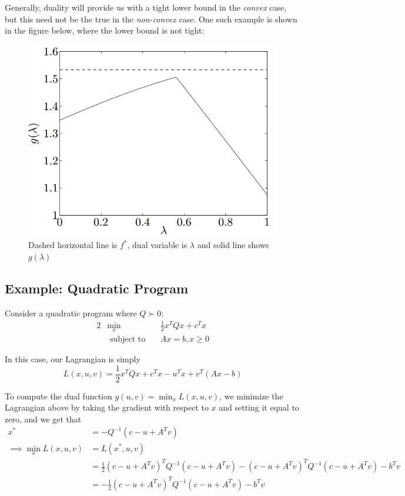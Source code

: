 \documentclass[twoside]{article}
\begin{document}
Generally, duality will provide us with a tight lower bound in the
\textit{convex} case, but this need not be the true in the \textit{non-convex} case. One such example is shown in the figure below, where the lower bound is not tight:
\begin{figure}[h]
  \centering
  \includegraphics[scale=0.3]{tightness.png}
  \caption{Dashed horizontal line is $f^*$, dual variable is $\lambda$ and solid line shows $g(\lambda)$}
  \label{fig:tightness}
\end{figure}

\subsection{Example: Quadratic Program}
Consider a quadratic program where $Q \succ 0$:
\begin{alignat*}{2}
&\min_x& &\frac{1}{2} x^T Q x + c^T x \\
&\text{ subject to}&~&Ax = b, x \geq 0
\end{alignat*}

In this case, our Lagrangian is simply
\[ L(x, u, v) = \frac{1}{2} x^T Q x + c^T x - u^T x + v^T(Ax - b) \]

To compute the dual function $g(u, v) = \min_x L(x, u, v)$, we minimize the
Lagrangian above by taking the gradient with respect to $x$ and setting it equal
to zero, and we get that
\begin{align*}
x^* &= -Q^{-1}(c - u + A^T v) \\
\implies \min_x L(x, u, v) &= L(x^*, u, v) \\
    &= \frac{1}{2} (c - u + A^T v)^T Q^{-1}(c - u + A^T v) - (c - u + A^T v)^T Q^{-1}(c - u + A^T v) - b^T v \\
    &= -\frac{1}{2} (c - u + A^T v)^T Q^{-1}(c - u + A^T v) - b^T v
\end{align*}
\end{document}
